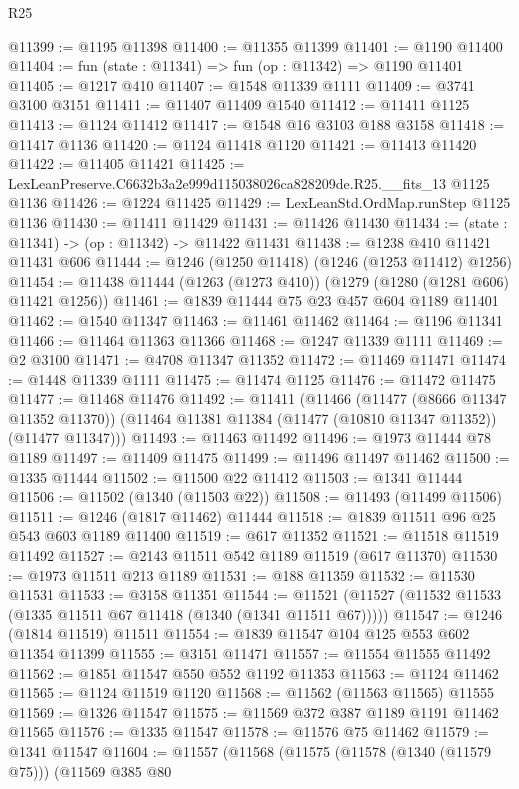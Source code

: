 \begin{lexlean}{R25}
\begin{coremodule}
@11399 := @1195 @11398
@11400 := @11355 @11399
@11401 := @1190 @11400
@11404 := fun (state : @11341) => fun (op : @11342) => @1190 @11401
@11405 := @1217 @410
@11407 := @1548 @11339 @1111
@11409 := @3741 @3100 @3151
@11411 := @11407 @11409 @1540
@11412 := @11411 @1125
@11413 := @1124 @11412
@11417 := @1548 @16 @3103 @188 @3158
@11418 := @11417 @1136
@11420 := @1124 @11418 @1120
@11421 := @11413 @11420
@11422 := @11405 @11421
@11425 := LexLeanPreserve.C6632b3a2e999d115038026ca828209de.R25.__fits_13 @1125 @1136
@11426 := @1224 @11425
@11429 := LexLeanStd.OrdMap.runStep @1125 @1136
@11430 := @11411 @11429
@11431 := @11426 @11430
@11434 := (state : @11341) -> (op : @11342) -> @11422 @11431
@11438 := @1238 @410 @11421 @11431 @606
@11444 := @1246 (@1250 @11418) (@1246 (@1253 @11412) @1256)
@11454 := @11438 @11444 (@1263 (@1273 @410)) (@1279 (@1280 (@1281 @606) @11421 @1256))
@11461 := @1839 @11444 @75 @23 @457 @604 @1189 @11401
@11462 := @1540 @11347
@11463 := @11461 @11462
@11464 := @1196 @11341
@11466 := @11464 @11363 @11366
@11468 := @1247 @11339 @1111
@11469 := @2 @3100
@11471 := @4708 @11347 @11352
@11472 := @11469 @11471
@11474 := @1448 @11339 @1111
@11475 := @11474 @1125
@11476 := @11472 @11475
@11477 := @11468 @11476
@11492 := @11411
    (@11466
      (@11477 (@8666 @11347 @11352 @11370))
      (@11464 @11381 @11384 (@11477 (@10810 @11347 @11352)) (@11477 @11347)))
@11493 := @11463 @11492
@11496 := @1973 @11444 @78 @1189
@11497 := @11409 @11475
@11499 := @11496 @11497 @11462
@11500 := @1335 @11444
@11502 := @11500 @22 @11412
@11503 := @1341 @11444
@11506 := @11502 (@1340 (@11503 @22))
@11508 := @11493 (@11499 @11506)
@11511 := @1246 (@1817 @11462) @11444
@11518 := @1839 @11511 @96 @25 @543 @603 @1189 @11400
@11519 := @617 @11352
@11521 := @11518 @11519 @11492
@11527 := @2143 @11511 @542 @1189 @11519 (@617 @11370)
@11530 := @1973 @11511 @213 @1189
@11531 := @188 @11359
@11532 := @11530 @11531
@11533 := @3158 @11351
@11544 := @11521 (@11527 (@11532 @11533 (@1335 @11511 @67 @11418 (@1340 (@1341 @11511 @67)))))
@11547 := @1246 (@1814 @11519) @11511
@11554 := @1839 @11547 @104 @125 @553 @602 @11354 @11399
@11555 := @3151 @11471
@11557 := @11554 @11555 @11492
@11562 := @1851 @11547 @550 @552 @1192 @11353
@11563 := @1124 @11462
@11565 := @1124 @11519 @1120
@11568 := @11562 (@11563 @11565) @11555
@11569 := @1326 @11547
@11575 := @11569 @372 @387 @1189 @1191 @11462 @11565
@11576 := @1335 @11547
@11578 := @11576 @75 @11462
@11579 := @1341 @11547
@11604 := @11557
    (@11568
      (@11575
        (@11578 (@1340 (@11579 @75)))
        (@11569
          @385
          @80

\end{coremodule}
\end{lexlean}
